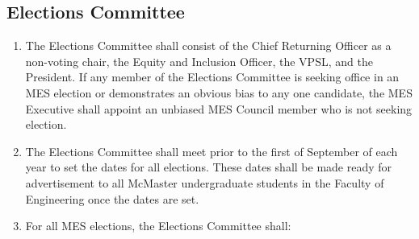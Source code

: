 \subsection{Elections Committee}
\label{elections-committee-guidelines}
\begin{enumerate}
 \item
  The Elections Committee shall consist of the Chief Returning Officer as a non-voting chair, the Equity and Inclusion Officer, the VPSL, and the President. If any member of the Elections Committee is seeking office in an MES election or demonstrates an obvious bias to any one candidate, the MES Executive shall appoint an unbiased MES Council member who is not seeking election. %
 \item
  The Elections Committee shall meet prior to the first of September of each year to set the dates for all elections. These dates shall be made ready for advertisement to all McMaster undergraduate students in the Faculty of Engineering once the dates are set.
 \item
  For all MES elections, the Elections Committee shall:


\end{enumerate}
